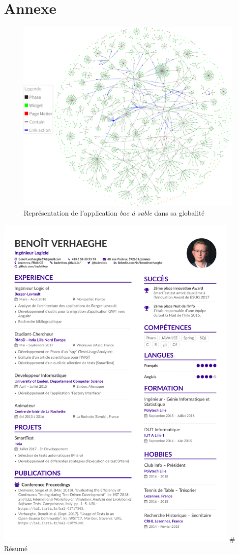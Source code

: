 \hypertarget{annexe}{%
\section{Annexe}\label{annexe}}

\hypertarget{firework}{%
\begin{figure}
\centering
\includegraphics{figures/firework.png}
\caption{Représentation de l'application \emph{bac à sable} dans sa
globalité}\label{firework}
\end{figure}
}

\includegraphics[width=0.9\textwidth,height=\textheight]{cv/cv.pdf} \#
Résumé

